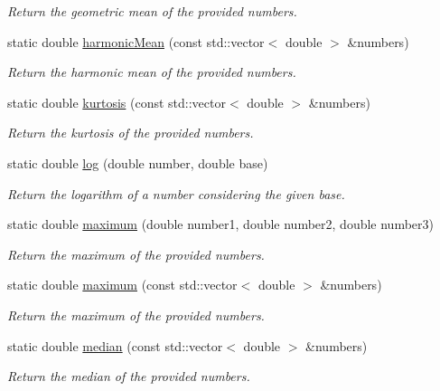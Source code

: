 \begin{DoxyCompactItemize}
\begin{DoxyCompactList}\small\item\em \-Return the geometric mean of the provided numbers. \end{DoxyCompactList}\item 
static double \hyperlink{classmultiscale_1_1Numeric_a7ed4c2e74893a486e639051abfbbcdb7}{harmonic\-Mean} (const std\-::vector$<$ double $>$ \&numbers)
\begin{DoxyCompactList}\small\item\em \-Return the harmonic mean of the provided numbers. \end{DoxyCompactList}\item 
static double \hyperlink{classmultiscale_1_1Numeric_a71ef1e4e0e845b64bcb06a27b9f8fbd3}{kurtosis} (const std\-::vector$<$ double $>$ \&numbers)
\begin{DoxyCompactList}\small\item\em \-Return the kurtosis of the provided numbers. \end{DoxyCompactList}\item 
static double \hyperlink{classmultiscale_1_1Numeric_a27b50deac29d8aca5c41c8b19fba43e9}{log} (double number, double base)
\begin{DoxyCompactList}\small\item\em \-Return the logarithm of a number considering the given base. \end{DoxyCompactList}\item 
static double \hyperlink{classmultiscale_1_1Numeric_a54d5578d5980315b7bade31a5655cd72}{maximum} (double number1, double number2, double number3)
\begin{DoxyCompactList}\small\item\em \-Return the maximum of the provided numbers. \end{DoxyCompactList}\item 
static double \hyperlink{classmultiscale_1_1Numeric_ab55b4d890c6221a8e10b37a0e5f2cbdc}{maximum} (const std\-::vector$<$ double $>$ \&numbers)
\begin{DoxyCompactList}\small\item\em \-Return the maximum of the provided numbers. \end{DoxyCompactList}\item 
static double \hyperlink{classmultiscale_1_1Numeric_a254f9df60a269739a1bfd5e7c383aed2}{median} (const std\-::vector$<$ double $>$ \&numbers)
\begin{DoxyCompactList}\small\item\em \-Return the median of the provided numbers. \end{DoxyCompactList}\item 

\end{DoxyCompactItemize}
